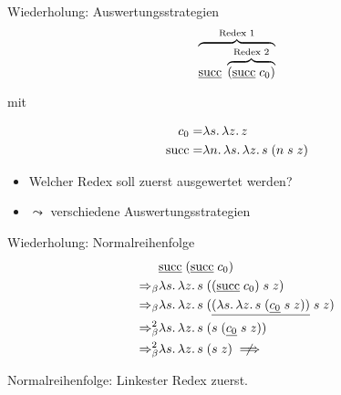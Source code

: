 \documentclass{beamer}
\begin{document}
\begin{frame}{Wiederholung: Auswertungsstrategien}
    \begin{equation*}
      \overbrace{\app{
          \uline{\csucc}
        }{
          \overbrace{(\app{\uline{\csucc}}{\cn{0}})}^{\text{Redex 2}}
        }}^{\text{Redex 1}}
    \end{equation*}

    mit

    \begin{eqnarray*}
      c_{0} =& \lambda s.\, \lambda z.\, z \\
      \text{succ} =& \lambda n.\, \lambda s.\, \lambda z.\, s\;(n\;s\;z)
    \end{eqnarray*}

\begin{itemize}
    \item Welcher Redex soll zuerst ausgewertet werden?
    \item $\leadsto$ verschiedene Auswertungsstrategien
\end{itemize}
\end{frame}

\begin{frame}{Wiederholung: Normalreihenfolge}
    \begin{eqnarray*}
      &
      \app{
        \uline{\csucc}
      }{
        (\app{\uline{\csucc}}{\cn{0}})
      } \\
      \Rightarrow_\beta&
      \lam{s}{\lam{z}{\app{s}{(\app{\app{(\app{\uline{\csucc}}{\cn{0}})}{s}}{z})}}} \\
      \Rightarrow_\beta&
      \lam{s}{\lam{z}{
        \app{s}{
          (\app{\app{\uline{(\lam{s}{\lam{z}{
            \app{s}{(\app{\app{\uline{\cn{0}}}{s}}{z})}
          }})}}{s}}{z})
        }
      }} \\
      \Rightarrow_\beta^2&
      \lam{s}{\lam{z}{
        \app{s}{(\app{s}{(\app{\app{\uline{\cn{0}}}{s}}{z})})}
      }} \\
      \Rightarrow_\beta^2&
      \lam{s}{\lam{z}{
        \app{s}{(\app{s}{z})}
      }} \centernot\implies
    \end{eqnarray*}

    \vfill

    Normalreihenfolge: Linkester Redex zuerst.
\end{frame}
\end{document}
